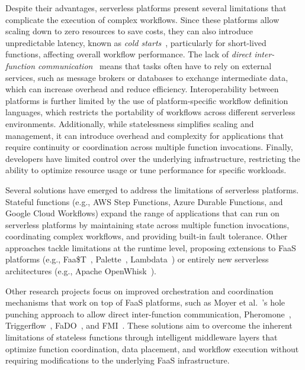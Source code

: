 Despite their advantages, serverless platforms present several limitations that complicate the execution of complex workflows. Since these platforms allow scaling down to zero resources to save costs, they can also introduce unpredictable latency, known as \textit{cold starts}~\cite{cold_starts_surey}, particularly for short-lived functions, affecting overall workflow performance. The lack of \textit{direct inter-function communication}~\cite{serverless_computing_drawbacks_survey_rw1} means that tasks often have to rely on external services, such as message brokers or databases to exchange intermediate data, which can increase overhead and reduce efficiency. Interoperability between platforms is further limited by the use of platform-specific workflow definition languages, which restricts the portability of workflows across different serverless environments. Additionally, while statelessness simplifies scaling and management, it can introduce overhead and complexity for applications that require continuity or coordination across multiple function invocations. Finally, developers have limited control over the underlying infrastructure, restricting the ability to optimize resource usage or tune performance for specific workloads.

Several solutions have emerged to address the limitations of serverless platforms. Stateful functions (e.g., AWS Step Functions\cite{aws_step_functions}, Azure Durable Functions\cite{azure_durable_functions}, and Google Cloud Workflows\cite{google_cloud_workflows}) expand the range of applications that can run on serverless platforms by maintaining state across multiple function invocations, coordinating complex workflows, and providing built-in fault tolerance. Other approaches tackle limitations at the runtime level, proposing extensions to FaaS platforms (e.g., Faa\$T~\cite{faast_caching}, Palette~\cite{palette_load_balancing}, Lambdata~\cite{lambdata_intents}) or entirely new serverless architectures (e.g., Apache OpenWhisk~\cite{open_whisk}). 

Other research projects focus on improved orchestration and coordination mechanisms that work on top of FaaS platforms, such as Moyer et al.~\cite{hole_punching_solution}'s hole punching approach to allow direct inter-function communication, Pheromone~\cite{pheromone}, Triggerflow~\cite{triggerflow}, FaDO~\cite{fado}, and FMI~\cite{fmi}. These solutions aim to overcome the inherent limitations of stateless functions through intelligent middleware layers that optimize function coordination, data placement, and workflow execution without requiring modifications to the underlying FaaS infrastructure.

